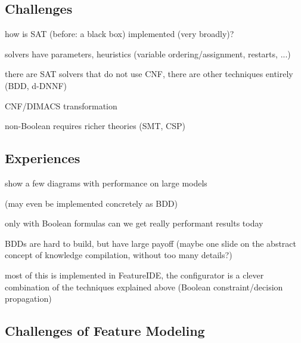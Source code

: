 \subsection{Challenges}
\begin{frame}{\myframetitle}
	how is SAT (before: a black box) implemented (very broadly)?

	solvers have parameters, heuristics (variable ordering/assignment, restarts, ...)

	there are SAT solvers that do not use CNF, there are other techniques entirely (BDD, d-DNNF)

	CNF/DIMACS transformation

	non-Boolean requires richer theories (SMT, CSP)
\end{frame}

\subsection{Experiences} %
\begin{frame}{\myframetitle}
	show a few diagrams with performance on large models

	(may even be implemented concretely as BDD)

	only with Boolean formulas can we get really performant results today

	BDDs are hard to build, but have large payoff (maybe one slide on the abstract concept of knowledge compilation, without too many details?)

	most of this is implemented in FeatureIDE, the configurator is a clever combination of the techniques explained above (Boolean constraint/decision propagation) %



\end{frame}


\subsection{Challenges of Feature Modeling}

